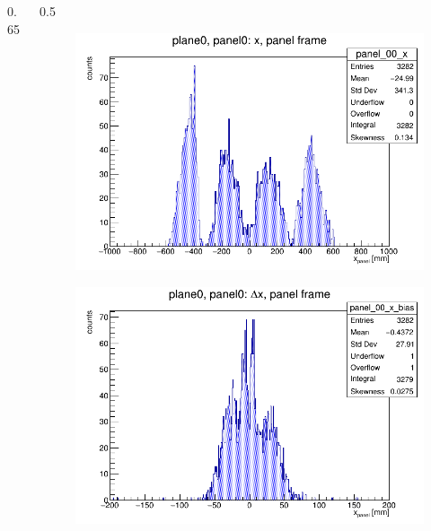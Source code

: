\documentclass{beamer}
\begin{document}
\begin{frame}
\begin{columns}
\begin{column}{0.65\framewidth}
\begin{itemize}
\end{itemize}
\end{column}
\begin{column}{0.5\framewidth}
\vspace{-3mm}
      \begin{figure}[!h]
      \centering
\includegraphics[width=1.\columnwidth]{figures/png/x_panel0.png}
     \label{fig:normalhits}
\end{figure}
\vspace{-5mm}
         \begin{figure}[!h]
      \centering
      \includegraphics[width=1.\columnwidth]{figures/png/panel_00_x_bias.png}
     \label{fig:normalhits}
\end{figure}
\end{column}
\end{columns}
\end{frame}
\end{document}
